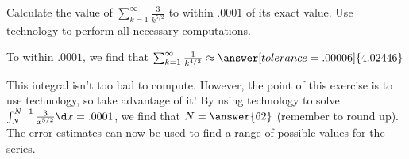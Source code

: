 \documentclass{ximera}
\author{Jim Talamo}
\begin{document}
\begin{exercise}

Calculate the value of $\sum_{k=1}^{\infty} \frac{3}{k^{5/2}}$ to within $.0001$ of its exact value.  Use technology to perform all necessary computations.


To within $.0001$, we find that $\sum_{k=1}^{\infty}  \frac{1}{k^{4/3}} \approx \answer[tolerance=.00006]{4.02446}$
\begin{hint}
This integral isn't too bad to compute.  However, the point of this exercise is to use technology, so take advantage of it!  By using technology to solve $\int_N^{N+1} \frac{3}{x^{5/2}} \d x =.0001$, we find that $N = \answer{62}$ (remember to round up).  The error estimates can now be used to find a range of possible values for the series.
\end{hint}

\end{exercise}
\end{document}
